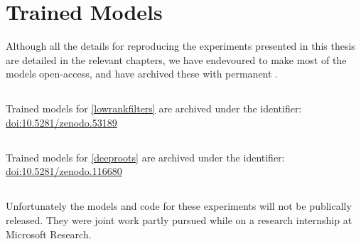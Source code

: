 \documentclass[thesis]{subfiles}
\begin{document}

\chapter{Trained Models}
\label{trainedmodels}
Although all the details for reproducing the experiments presented in this thesis are detailed in the relevant chapters, we have endevoured to make most of the models open-access, and have archived these with permanent .
\section*{}
Trained models for \cref{lowrankfilters} are archived under the identifier:
\href{https://doi.org/10.5281/zenodo.53189}{doi:10.5281/zenodo.53189}
\section*{}
Trained models for \cref{deeproots} are archived under the identifier:
\href{https://doi.org/10.5281/zenodo.116680}{doi:10.5281/zenodo.116680}
\section*{}
Unfortunately the models and code for these experiments will not be publically released. They were joint work partly pursued while on a research internship at Microsoft Research.
\end{document}
